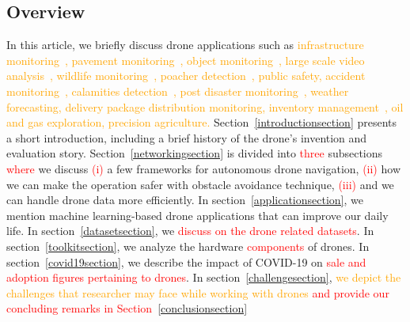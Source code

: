 \subsection*{\textbf{Overview}}
In this article, we briefly discuss drone applications such as \textcolor{orange}{infrastructure monitoring~\cite{kucuksubasi2018transfer, kang2018autonomous}, pavement monitoring~\cite{wu2018coupling, fan2019real}, object monitoring~\cite{li2017visual, saribas2019hybrid}, large scale video analysis~\cite{zhang2019dense}, wildlife monitoring~\cite{mayer2019drones, brennan2019drones}, poacher detection~\cite{bondi2018spot}, public safety, accident monitoring~\cite{garcia2018explainable}, calamities detection~\cite{kyrkou2019deep}, post disaster monitoring~\cite{tariq2018dronaid}, weather forecasting, delivery package distribution monitoring\cite{apolo2020deep}, inventory management~\cite{fernandez2019towards}, oil and gas exploration, precision agriculture.}
Section~\ref{introductionsection} presents a short introduction, including a brief history of the drone's invention and evaluation story. Section~\ref{networkingsection} is divided into \textcolor{red}{three} subsections \textcolor{red}{where} we discuss \textcolor{red}{(i)} a few frameworks for autonomous drone navigation, \textcolor{red}{(ii)} how we can make the operation safer with obstacle avoidance technique, \textcolor{red}{(iii)} and we can handle drone data more efficiently. 
In section~\ref{applicationsection}, we mention machine learning-based drone applications that can improve our daily life. In section~\ref{datasetsection}, we \textcolor{red}{discuss on the drone related datasets}. In section~\ref{toolkitsection}, we analyze the hardware \textcolor{red}{components} of drones. In section~\ref{covid19section}, we describe the impact of COVID-19 on \textcolor{red}{sale and adoption figures pertaining to drones}. In section~\ref{challengesection}, \textcolor{orange}{we depict the challenges that researcher may face while working with drones} \textcolor{red}{and provide our concluding remarks in Section~\ref{conclusionsection}}
%
